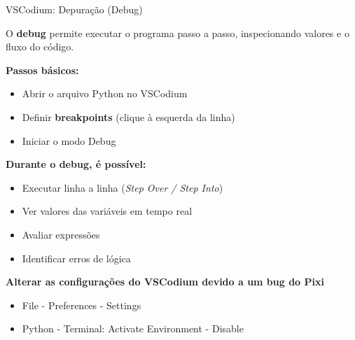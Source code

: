 \documentclass{beamer}
\begin{document}
\begin{frame}{VSCodium: Depuração (Debug)}
    
    O \textbf{debug} permite executar o programa passo a passo,
    inspecionando valores e o fluxo do código.
    
    \vspace{0.3cm}
    
    \textbf{Passos básicos:}
    \begin{itemize}
        \item Abrir o arquivo Python no VSCodium
        \item Definir \textbf{breakpoints} (clique à esquerda da linha)
        \item Iniciar o modo Debug
    \end{itemize}
    
    \textbf{Durante o debug, é possível:}
    \begin{itemize}
        \item Executar linha a linha (\textit{Step Over / Step Into})
        \item Ver valores das variáveis em tempo real
        \item Avaliar expressões
        \item Identificar erros de lógica
    \end{itemize}

    \textbf{Alterar as configurações do VSCodium devido a um bug do Pixi}
    \begin{itemize}
        \item File - Preferences - Settings
        \item Python - Terminal: Activate Environment - Disable
    \end{itemize}

    
\end{frame}
\end{document}
